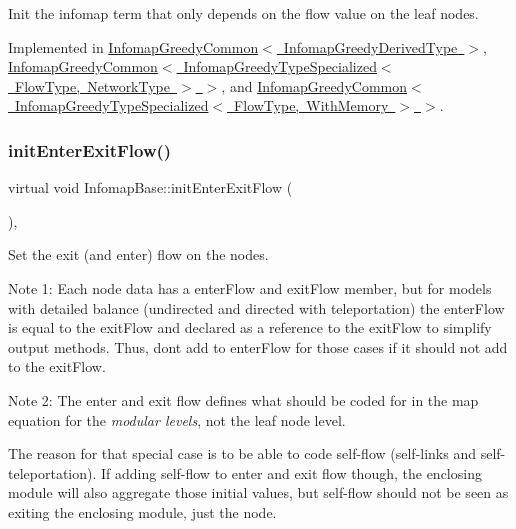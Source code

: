 Init the infomap term that only depends on the flow value on the leaf nodes. 

Implemented in \mbox{\hyperlink{classInfomapGreedyCommon_af6135849730a24a4f3fea57ff32991e5}{Infomap\+Greedy\+Common$<$ Infomap\+Greedy\+Derived\+Type $>$}}, \mbox{\hyperlink{classInfomapGreedyCommon_af6135849730a24a4f3fea57ff32991e5}{Infomap\+Greedy\+Common$<$ Infomap\+Greedy\+Type\+Specialized$<$ Flow\+Type, Network\+Type $>$ $>$}}, and \mbox{\hyperlink{classInfomapGreedyCommon_af6135849730a24a4f3fea57ff32991e5}{Infomap\+Greedy\+Common$<$ Infomap\+Greedy\+Type\+Specialized$<$ Flow\+Type, With\+Memory $>$ $>$}}.

\mbox{\label{classInfomapBase_a689210ed8f0eaeb767dc1321dfec65f5}} 
\subsubsection{\texorpdfstring{init\+Enter\+Exit\+Flow()}{initEnterExitFlow()}}
{\footnotesize\ttfamily virtual void Infomap\+Base\+::init\+Enter\+Exit\+Flow (\begin{DoxyParamCaption}{ }\end{DoxyParamCaption})\hspace{0.3cm}{\ttfamily [protected]}, {}}

Set the exit (and enter) flow on the nodes.

Note 1\+: Each node data has a enter\+Flow and exit\+Flow member, but for models with detailed balance (undirected and directed with teleportation) the enter\+Flow is equal to the exit\+Flow and declared as a reference to the exit\+Flow to simplify output methods. Thus, don\textquotesingle{}t add to enter\+Flow for those cases if it should not add to the exit\+Flow.

Note 2\+: The enter and exit flow defines what should be coded for in the map equation for the {\itshape modular levels}, not the leaf node level.

The reason for that special case is to be able to code self-\/flow (self-\/links and self-\/teleportation). If adding self-\/flow to enter and exit flow though, the enclosing module will also aggregate those initial values, but self-\/flow should not be seen as exiting the enclosing module, just the node.

